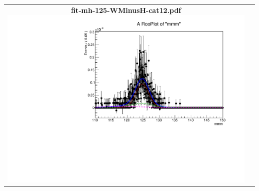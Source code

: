 \begin{longtable}{|c|c|}
{}
 \\
\hline
\parbox{0.49\textwidth}{
\centering
{\bfseries fit-mh-125-WMinusH-cat12.pdf}
\includegraphics[width=.49\textwidth]{figures/signal_model/AppendixBdt/WMinusH/125/fit_mh_125_WMinusH_cat12.pdf}
}
 & \\ \hline
\end{longtable}
